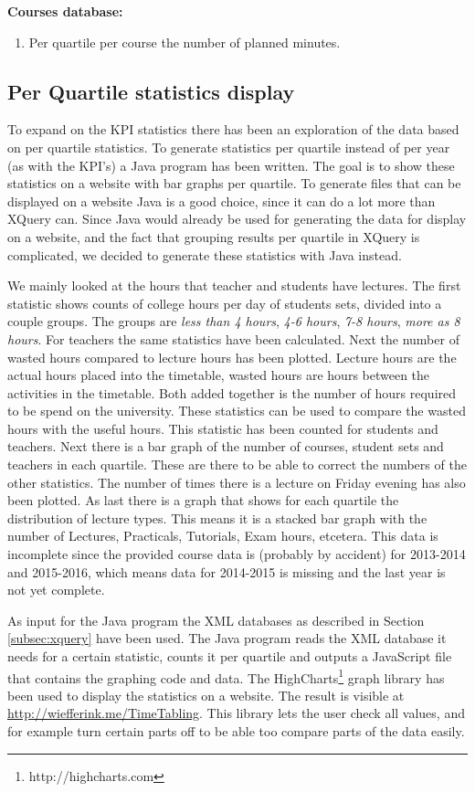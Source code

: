\textbf{Courses database:}
\begin{enumerate}
	\item Per quartile per course the number of planned minutes.
\end{enumerate}

\subsection{Per Quartile statistics display}
To expand on the KPI statistics there has been an exploration of the data based on per quartile statistics. To generate statistics per quartile instead of per year (as with the KPI's) a Java program has been written. The goal is to show these statistics on a website with bar graphs per quartile. To generate files that can be displayed on a website Java is a good choice, since it can do a lot more than XQuery can. Since Java would already be used for generating the data for display on a website, and the fact that grouping results per quartile in XQuery is complicated, we decided to generate these statistics with Java instead.

We mainly looked at the hours that teacher and students have lectures. The first statistic shows counts of college hours per day of students sets, divided into a couple groups. The groups are \emph{less than 4 hours}, \emph{4-6 hours}, \emph{7-8 hours}, \emph{more as 8 hours}. For teachers the same statistics have been calculated. Next the number of wasted hours compared to lecture hours has been plotted. Lecture hours are the actual hours placed into the timetable, wasted hours are hours between the activities in the timetable. Both added together is the number of hours required to be spend on the university. These statistics can be used to compare the wasted hours with the useful hours. This statistic has been counted for students and teachers. Next there is a bar graph of the number of courses, student sets and teachers in each quartile. These are there to be able to correct the numbers of the other statistics. The number of times there is a lecture on Friday evening has also been plotted. As last there is a graph that shows for each quartile the distribution of lecture types. This means it is a stacked bar graph with the number of Lectures, Practicals, Tutorials, Exam hours, etcetera. This data is incomplete since the provided course data is (probably by accident) for 2013-2014 and 2015-2016, which means data for 2014-2015 is missing and the last year is not yet complete.

As input for the Java program the XML databases as described in Section \ref{subsec:xquery} have been used. The Java program reads the XML database it needs for a certain statistic, counts it per quartile and outputs a JavaScript file that contains the graphing code and data. The HighCharts\footnote{http://highcharts.com} graph library has been used to display the statistics on a website. The result is visible at \url{http://wiefferink.me/TimeTabling}. This library lets the user check all values, and for example turn certain parts off to be able too compare parts of the data easily.






